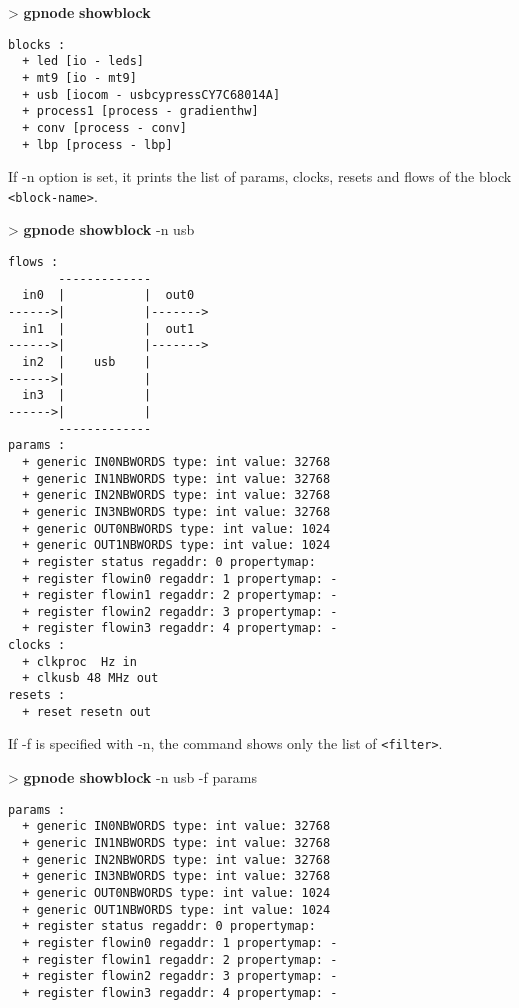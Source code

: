 \documentclass[10pt,a4paper]{article}
\begin{document}
\begin{sampletitle}
> \textbf{gpnode} \textbf{showblock}
\begin{Verbatim}
blocks :
  + led [io - leds]
  + mt9 [io - mt9]
  + usb [iocom - usbcypressCY7C68014A]
  + process1 [process - gradienthw]
  + conv [process - conv]
  + lbp [process - lbp]
\end{Verbatim}
\end{sampletitle}

If -n option is set, it prints the list of params, clocks, resets and flows of the block \texttt{<block-name>}.

\begin{sampletitle}
> \textbf{gpnode showblock} -n usb
\begin{Verbatim}
flows :
       -------------        
  in0  |           |  out0  
------>|           |------->
  in1  |           |  out1  
------>|           |------->
  in2  |    usb    |        
------>|           |        
  in3  |           |        
------>|           |        
       -------------
params :
  + generic IN0NBWORDS type: int value: 32768
  + generic IN1NBWORDS type: int value: 32768
  + generic IN2NBWORDS type: int value: 32768
  + generic IN3NBWORDS type: int value: 32768
  + generic OUT0NBWORDS type: int value: 1024
  + generic OUT1NBWORDS type: int value: 1024
  + register status regaddr: 0 propertymap: 
  + register flowin0 regaddr: 1 propertymap: -
  + register flowin1 regaddr: 2 propertymap: -
  + register flowin2 regaddr: 3 propertymap: -
  + register flowin3 regaddr: 4 propertymap: -
clocks :
  + clkproc  Hz in
  + clkusb 48 MHz out
resets :
  + reset resetn out
\end{Verbatim}
\end{sampletitle}

If -f is specified with -n, the command shows only the list of \texttt{<filter>}.

\begin{sampletitle}
> \textbf{gpnode showblock} -n usb -f params
\begin{Verbatim}
params :
  + generic IN0NBWORDS type: int value: 32768
  + generic IN1NBWORDS type: int value: 32768
  + generic IN2NBWORDS type: int value: 32768
  + generic IN3NBWORDS type: int value: 32768
  + generic OUT0NBWORDS type: int value: 1024
  + generic OUT1NBWORDS type: int value: 1024
  + register status regaddr: 0 propertymap: 
  + register flowin0 regaddr: 1 propertymap: -
  + register flowin1 regaddr: 2 propertymap: -
  + register flowin2 regaddr: 3 propertymap: -
  + register flowin3 regaddr: 4 propertymap: -
\end{Verbatim}
\end{sampletitle}
\end{document}
